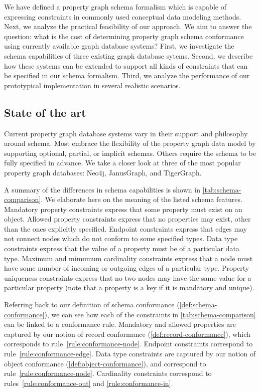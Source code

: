 \documentclass{article}
\theoremstyle{definition}
\begin{document}
We have defined a property graph schema formalism which is capable of expressing constraints in commonly used conceptual data modeling methods. Next, we analyze the practical feasibility of our approach. We aim to answer the question: what is the cost of determining property graph schema conformance using currently available graph database systems? First, we investigate the schema capabilities of three existing graph database sytems. Second, we describe how these systems can be extended to support all kinds of constraints that can be specified in our schema formalism. Third, we analyze the performance of our prototypical implementation in several realistic scenarios.

\subsection{State of the art}
\label{sec:sota}

Current property graph database systems vary in their support and philosophy around schema. Most embrace the flexibility of the property graph data model by supporting optional, partial, or implicit schemas. Others require the schema to be fully specified in advance. We take a closer look at three of the most popular property graph databases: Neo4j, JanusGraph, and TigerGraph.

A summary of the differences in schema capabilities is shown in \autoref{tab:schema-comparison}. We elaborate here on the meaning of the listed schema features. Mandatory property constraints express that some property must exist on an object. Allowed property constraints express that no properties may exist, other than the ones explicitly specified. Endpoint constraints express that edges may not connect nodes which do not conform to some specified types. Data type constraints express that the value of a property must be of a particular data type. Maximum and mimumum cardinality constraints express that a node must have some number of incoming or outgoing edges of a particular type. Property uniqueness constraints express that no two nodes may have the same value for a particular property (note that a property is a key if it is mandatory and unique).

Referring back to our definition of schema conformance (\autoref{def:schema-conformance}), we can see how each of the constraints in \autoref{tab:schema-comparison} can be linked to a conformance rule. Mandatory and allowed properties are captured by our notion of record conformance (\autoref{def:record-conformance}), which corresponds to rule~\ref{rule:conformance-node}. Endpoint constraints correspond to rule~\ref{rule:conformance-edge}. Data type constraints are captured by our notion of object conformance (\autoref{def:object-conformance}), and correspond to rule~\ref{rule:conformance-node}. Cardinality constraints correspond to rules~\ref{rule:conformance-out} and \ref{rule:conformance-in}.
\end{document}
